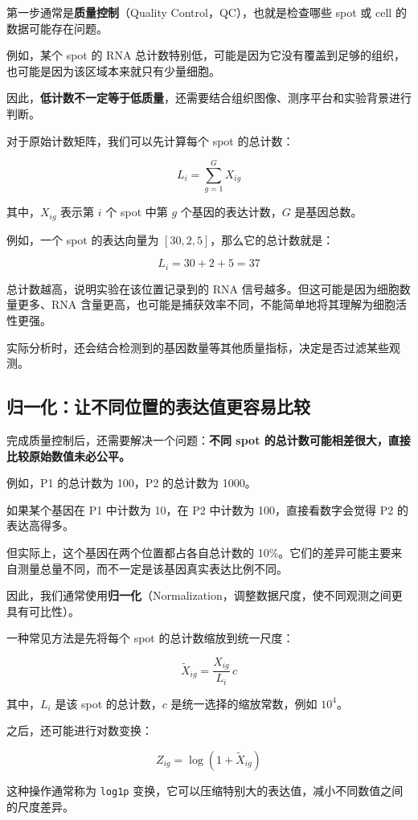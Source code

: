 \documentclass[UTF8,a4paper,11pt,fontset=fandol]{ctexart}
\newcommand{\term}[2]{{\color{accent}\textbf{#1}}（#2）}
\newcommand{\code}[1]{{\color{tealaccent}\texttt{#1}}}
\begin{document}
第一步通常是\term{质量控制}{Quality Control，QC}，也就是检查哪些 spot 或 cell 的数据可能存在问题。

例如，某个 spot 的 RNA 总计数特别低，可能是因为它没有覆盖到足够的组织，也可能是因为该区域本来就只有少量细胞。

因此，\textbf{低计数不一定等于低质量}，还需要结合组织图像、测序平台和实验背景进行判断。

对于原始计数矩阵，我们可以先计算每个 spot 的总计数：

\[
L_i=\sum_{g=1}^{G}X_{ig}
\]

其中，$X_{ig}$ 表示第 $i$ 个 spot 中第 $g$ 个基因的表达计数，$G$ 是基因总数。

例如，一个 spot 的表达向量为 $[30,2,5]$，那么它的总计数就是：

\[
L_i=30+2+5=37
\]

总计数越高，说明实验在该位置记录到的 RNA 信号越多。但这可能是因为细胞数量更多、RNA 含量更高，也可能是捕获效率不同，不能简单地将其理解为细胞活性更强。

实际分析时，还会结合检测到的基因数量等其他质量指标，决定是否过滤某些观测。

\subsection{归一化：让不同位置的表达值更容易比较}

完成质量控制后，还需要解决一个问题：\textbf{不同 spot 的总计数可能相差很大，直接比较原始数值未必公平。}

例如，P1 的总计数为 100，P2 的总计数为 1000。

如果某个基因在 P1 中计数为 10，在 P2 中计数为 100，直接看数字会觉得 P2 的表达高得多。

但实际上，这个基因在两个位置都占各自总计数的 10\%。它们的差异可能主要来自测量总量不同，而不一定是该基因真实表达比例不同。

因此，我们通常使用\term{归一化}{Normalization，调整数据尺度，使不同观测之间更具有可比性}。

一种常见方法是先将每个 spot 的总计数缩放到统一尺度：

\[
\widetilde{X}_{ig}
=\frac{X_{ig}}{L_i}\,c
\]

其中，$L_i$ 是该 spot 的总计数，$c$ 是统一选择的缩放常数，例如 $10^4$。

之后，还可能进行对数变换：

\[
Z_{ig}=\log(1+\widetilde{X}_{ig})
\]

这种操作通常称为 \code{log1p} 变换，它可以压缩特别大的表达值，减小不同数值之间的尺度差异。\cite{scanpy}
\end{document}
